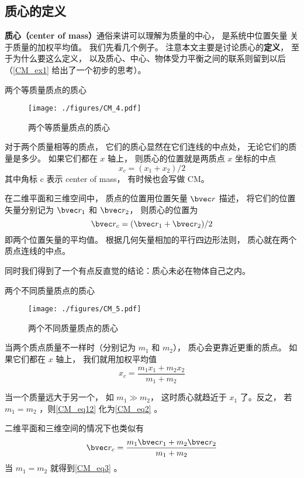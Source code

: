 

\subsection{质心的定义}
\textbf{质心（center of mass）}通俗来讲可以理解为质量的中心， 是系统中位置矢量 关于质量的加权平均值。 我们先看几个例子。 注意本文主要是讨论质心的\textbf{定义}， 至于为什么要这么定义， 以及质心、中心、物体受力平衡之间的联系则留到以后（\autoref{CM_ex1} 给出了一个初步的思考）。

\begin{example}{两个等质量质点的质心}

\begin{figure}[ht]
\centering
\texttt{[image: ./figures/CM\_4.pdf]}
\caption{两个等质量质点的质心} \label{CM_fig4}
\end{figure}
对于两个质量相等的质点， 它们的质心显然在它们连线的中点处， 无论它们的质量是多少。 如果它们都在 $x$ 轴上， 则质心的位置就是两质点 $x$ 坐标的中点
\begin{equation}\label{CM_eq2}
x_c = (x_1 + x_2)/2
\end{equation}
其中角标 c 表示 center of mass， 有时候也会写做 CM。

在二维平面和三维空间中， 质点的位置用位置矢量 $\bvec r$ 描述， 将它们的位置矢量分别记为 $\bvec r_1$ 和 $\bvec r_2$， 则质心的位置为
\begin{equation}\label{CM_eq3}
\bvec r_c = (\bvec r_1 + \bvec r_2)/2
\end{equation}
即两个位置矢量的平均值。 根据几何矢量相加的平行四边形法则， 质心就在两个质点连线的中点。

同时我们得到了一个有点反直觉的结论：质心未必在物体自己之内。
\end{example}

\begin{example}{两个不同质量质点的质心}
\begin{figure}[ht]
\centering
\texttt{[image: ./figures/CM\_5.pdf]}
\caption{两个不同质量质点的质心} \label{CM_fig5}
\end{figure}
当两个质点质量不一样时（分别记为 $m_1$ 和 $m_2$）， 质心会更靠近更重的质点。 如果它们都在 $x$ 轴上， 我们就用加权平均值
\begin{equation}\label{CM_eq12}
x_c = \frac{m_1 x_1 + m_2 x_2}{m_1 + m_2}
\end{equation}

当一个质量远大于另一个， 如 $m_1 \gg m_2$， 这时质心就趋近于 $x_1$ 了。反之， 若$m_1 = m_2$ ，则\autoref{CM_eq12} 化为\autoref{CM_eq2} 。

二维平面和三维空间的情况下也类似有
\begin{equation}\label{CM_eq5}
\bvec r_c = \frac{m_1 \bvec r_1 + m_2 \bvec r_2}{m_1 + m_2}
\end{equation}
当 $m_1 = m_2$ 就得到\autoref{CM_eq3} 。
\end{example}

